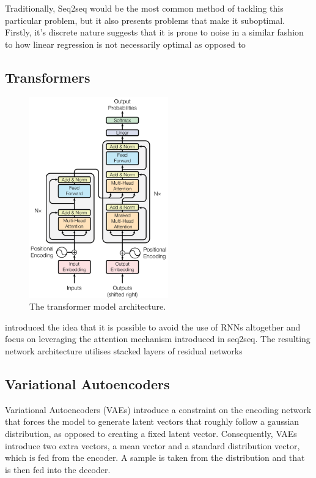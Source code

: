 \documentclass[12pt,twoside]{report}
\begin{document}
Traditionally, Seq2seq would be the most common method of tackling this particular problem, but it also presents problems that make it suboptimal. Firstly, it's discrete nature suggests that it is prone to noise in a similar fashion to how linear regression is not necessarily optimal as opposed to 

\subsection{Transformers}

\begin{figure}[!ht]
      
	\centering
	\includegraphics[width=60mm]{diagrams/transformers.png}
	\caption{The transformer model architecture.\cite{vaswani_attention_2017} \label{transformer}}
  \end{figure}

\cite{vaswani_attention_2017} introduced the idea that it is possible to avoid the use of RNNs altogether and focus on leveraging the attention mechanism introduced in seq2seq. The resulting network architecture utilises stacked layers of residual networks 

\subsection{Variational Autoencoders}

Variational Autoencoders (VAEs) introduce a constraint on the encoding network that forces the model to generate latent vectors that roughly follow a gaussian distribution, as opposed to creating a fixed latent vector. Consequently, VAEs introduce two extra vectors, a mean vector and a standard distribution vector, which is fed from the encoder. A sample is taken from the distribution and that is then fed into the decoder.
\end{document}
